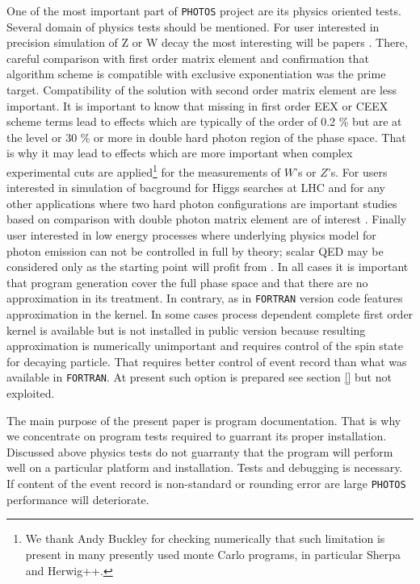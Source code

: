 \documentclass[]{Photos_interface_design}
\begin{document}
One of the most important part of {\tt PHOTOS} project are its physics oriented tests.
Several domain
of physics tests should be mentioned. For user interested in precision 
simulation of Z or W decay the most interesting will be papers \cite{Nanava:2009vg,Golonka:2006tw}. There, careful comparison with first order matrix element 
and confirmation that algorithm scheme  is compatible with exclusive 
exponentiation was the prime target. Compatibility of the solution
with second order matrix element are less important. 
It is important to know that missing in first order EEX or CEEX \cite{koralz4:1994,kkcpc:1999} 
scheme terms
lead to effects which are typically of the order of 0.2 \% but are at the level 
or 30 \% or more in double hard photon region of the phase space. That is 
why it may lead to effects which are more important when complex experimental 
cuts are applied\footnote{We thank Andy Buckley for checking numerically
 that such limitation is present in many presently used monte Carlo programs,
in particular Sherpa and Herwig++.  } 
for the measurements of $W$'s or $Z$'s.
 For users interested in simulation of
bacground for Higgs searches at LHC and for any other applications where 
two hard photon configurations are important studies based on comparison with 
double photon matrix element are of 
interest \cite{Barberio:1993qi,RichterWas:1994ep,RichterWas:1993ta}.
Finally user interested in low energy processes where underlying physics model 
for photon emission can not be controlled in full by theory; scalar QED may 
be considered only as the starting point will profit 
from \cite{Nanava:2009vg,Nanava:2006vv}. In all cases it is important that
 program generation cover the full phase space and that there are no 
approximation in its treatment. In contrary, as in {\tt FORTRAN} version code 
features approximation in the kernel. In some cases process dependent 
complete first order 
kernel is available but is not installed in public version  
because resulting approximation is 
numerically unimportant and requires control of the spin state for decaying 
particle. That requires better control of event record than what was available 
in {\tt FORTRAN}. At present such option is prepared see section \ref{} but not exploited. 

The main purpose of the present paper is program documentation. That is why
we concentrate on program tests required to guarrant its proper installation.
Discussed above physics tests
do not guarranty that the program will perform well on a particular platform and installation. Tests and debugging
is necessary.  If content of the event record is non-standard or rounding error are large {\tt PHOTOS} performance will deteriorate.
\end{document}
